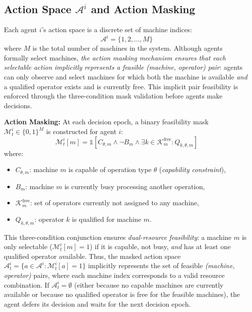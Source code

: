 \subsection{Action Space $\mathcal{A}^i$ and Action Masking}
Each agent \( i \)'s action space is a discrete set of machine indices:
\[
\mathcal{A}^i = \{1, 2, \ldots, M\}
\]
where \( M \) is the total number of machines in the system. Although agents formally select machines, \textit{the action masking mechanism ensures that each selectable action implicitly represents a feasible (machine, operator) pair}: agents can only observe and select machines for which both the machine is available \textit{and} a qualified operator exists and is currently free. This implicit pair feasibility is enforced through the three-condition mask validation before agents make decisions.

\textbf{Action Masking:} At each decision epoch, a binary feasibility mask \( \mathcal{M}_t^i \in \{0,1\}^M \) is constructed for agent \( i \):
\begin{equation}
\mathcal{M}_t^i[m] = \mathbb{1}\left[ C_{\theta,m} \land \neg B_m \land \exists k \in \mathcal{K}_m^{\text{free}} : Q_{k,\theta,m} \right]
\end{equation}
where:
\begin{itemize}
    \item \( C_{\theta,m} \): machine \( m \) is capable of operation type \( \theta \) (\textit{capability constraint}),
    \item \( B_m \): machine \( m \) is currently busy processing another operation,
    \item \( \mathcal{K}_m^{\text{free}} \): set of operators currently not assigned to any machine,
    \item \( Q_{k,\theta,m} \): operator \( k \) is qualified for machine \( m \).
\end{itemize}

This three-condition conjunction ensures \textit{dual-resource feasibility}: a machine \( m \) is only selectable (\( \mathcal{M}_t^i[m] = 1 \)) if it is capable, not busy, \textit{and} has at least one qualified operator available. Thus, the masked action space \( \mathcal{A}_t^i = \{ a \in \mathcal{A}^i : \mathcal{M}_t^i[a] = 1 \} \) implicitly represents the set of feasible \textit{(machine, operator)} pairs, where each machine index corresponds to a valid resource combination. If \( \mathcal{A}_t^i = \emptyset \) (either because no capable machines are currently available or because no qualified operator is free for the feasible machines), the agent defers its decision and waits for the next decision epoch.

